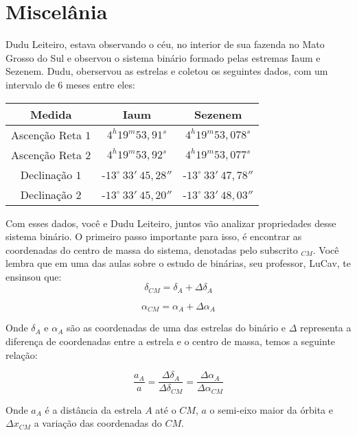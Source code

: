\documentclass[11pt]{article}
\begin{document}
\section{Miscelânia}
\begin{pproblem} 
    Dudu Leiteiro, estava observando o céu, no interior de sua fazenda no Mato Grosso do Sul e observou o sistema binário formado pelas estremas Iaum e Sezenem. Dudu, oberservou as estrelas e coletou os seguintes dados, com um intervalo de 6 meses entre eles:
    \\
    \begin{center}
        \begin{tabular}{|c|c|c|}
            \hline %
            Medida & Iaum & Sezenem   \\ 
            \hline
            Ascenção Reta \(1\) & \(4^h19^m53,91^s\) & \(4^h19^m53,078^s\) \\
            Ascenção Reta \(2\) & \(4^h19^m53,92^s\) & \(4^h19^m53,077^s\) \\
            Declinação \(1\) & -\(13^\circ \ 33' \ 45,28''\) & -\(13^\circ \ 33' \ 47,78''\) \\
            Declinação \(2\) & -\(13^\circ \ 33' \ 45,20''\) & -\(13^\circ \ 33' \ 48,03''\) \\
            \hline
        \end{tabular} 
\end{center}
    Com esses dados, você e Dudu Leiteiro, juntos vão analizar propriedades desse sistema binário. O primeiro passo importante para isso, é encontrar as coordenadas do centro de massa do sistema, denotadas pelo subscrito \(_{CM}\). Você lembra que em uma das aulas sobre o estudo de binárias, seu professor, LuCav, te ensinsou que:
    \[
    \delta_{CM} = \delta_A + \Delta\delta_A
    \]

    \[
    \alpha_{CM} = \alpha_A + \Delta\alpha_A
    \]

    Onde \(\delta_A\) e \(\alpha_A\) são as coordenadas de uma das estrelas do binário e \(\Delta\) representa a diferença de coordenadas entre a estrela e o centro de massa, temos a seguinte relação:

    \[
    \frac{a_A}{a} = \frac{\Delta\delta_A}{\Delta\delta_{CM}} = \frac{\Delta\alpha_A}{\Delta\alpha_{CM}}
    \]

    Onde \(a_A\) é a distância da estrela \(A\) até o \(CM\), \(a\) o semi-eixo maior da órbita e \(\Delta x_{CM}\) a variação das coordenadas do \(CM\). 
    

\end{pproblem}
\end{document}
